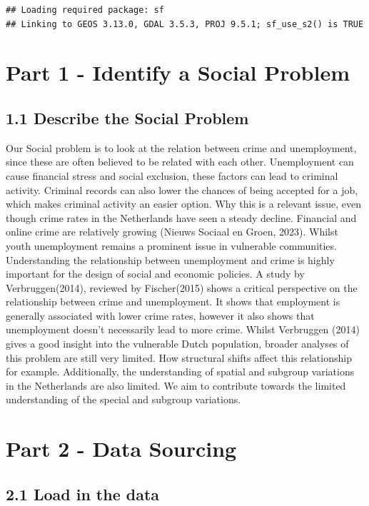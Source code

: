 \documentclass[
]{article}
\begin{document}
\begin{verbatim}
## Loading required package: sf
## Linking to GEOS 3.13.0, GDAL 3.5.3, PROJ 9.5.1; sf_use_s2() is TRUE
\end{verbatim}

\section{Part 1 - Identify a Social
Problem}\label{part-1---identify-a-social-problem}

\subsection{1.1 Describe the Social
Problem}\label{describe-the-social-problem}

Our Social problem is to look at the relation between crime and
unemployment, since these are often believed to be related with each
other. Unemployment can cause financial stress and social exclusion,
these factors can lead to criminal activity. Criminal records can also
lower the chances of being accepted for a job, which makes criminal
activity an easier option. Why this is a relevant issue, even though
crime rates in the Netherlands have seen a steady decline. Financial and
online crime are relatively growing (Nieuws Sociaal en Groen, 2023).
Whilst youth unemployment remains a prominent issue in vulnerable
communities. Understanding the relationship between unemployment and
crime is highly important for the design of social and economic
policies. A study by Verbruggen(2014), reviewed by Fischer(2015) shows a
critical perspective on the relationship between crime and unemployment.
It shows that employment is generally associated with lower crime rates,
however it also shows that unemployment doesn't necessarily lead to more
crime. Whilst Verbruggen (2014) gives a good insight into the vulnerable
Dutch population, broader analyses of this problem are still very
limited. How structural shifts affect this relationship for example.
Additionally, the understanding of spatial and subgroup variations in
the Netherlands are also limited. We aim to contribute towards the
limited understanding of the special and subgroup variations.

\section{Part 2 - Data Sourcing}\label{part-2---data-sourcing}

\subsection{2.1 Load in the data}\label{load-in-the-data}
\end{document}
